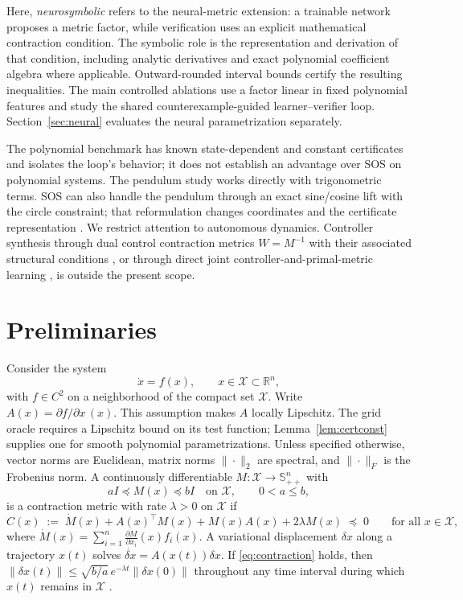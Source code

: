 \documentclass[12pt,onecolumn,journal]{IEEEtran}
\newcommand{\R}{\mathbb{R}}
\newcommand{\Sym}{\mathbb{S}}
\newcommand{\X}{\mathcal{X}}
\begin{document}
Here, \emph{neurosymbolic} refers to the neural-metric extension: a trainable network proposes a metric factor, while verification uses an explicit mathematical contraction condition. The symbolic role is the representation and derivation of that condition, including analytic derivatives and exact polynomial coefficient algebra where applicable. Outward-rounded interval bounds certify the resulting inequalities. The main controlled ablations use a factor linear in fixed polynomial features and study the shared counterexample-guided learner--verifier loop. Section~\ref{sec:neural} evaluates the neural parametrization separately.

The polynomial benchmark has known state-dependent and constant certificates and isolates the loop's behavior; it does not establish an advantage over SOS on polynomial systems. The pendulum study works directly with trigonometric terms. SOS can also handle the pendulum through an exact sine/cosine lift with the circle constraint; that reformulation changes coordinates and the certificate representation \cite{tedrake2026}. We restrict attention to autonomous dynamics. Controller synthesis through dual control contraction metrics $W=M^{-1}$ with their associated structural conditions \cite{manchester2017}, or through direct joint controller-and-primal-metric learning \cite{davydov2025partitioning,harapanahalli2026}, is outside the present scope.

\section{Preliminaries}
\label{sec:prelim}

Consider the system
\begin{equation}
\dot{x} = f(x), \qquad x \in \X \subset \R^n,
\label{eq:sys}
\end{equation}
with $f\in C^2$ on a neighborhood of the compact set $\X$. Write $A(x) = \partial f/\partial x\,(x)$. This assumption makes $A$ locally Lipschitz. The grid oracle requires a Lipschitz bound on its test function; Lemma~\ref{lem:certconst} supplies one for smooth polynomial parametrizations. Unless specified otherwise, vector norms are Euclidean, matrix norms $\|\cdot\|_2$ are spectral, and $\|\cdot\|_F$ is the Frobenius norm. A continuously differentiable $M : \X \to \Sym^n_{++}$ with
\begin{equation}
a I \preceq M(x) \preceq b I \quad \text{on } \X, \qquad 0 < a \le b,
\label{eq:bounds}
\end{equation}
is a contraction metric with rate $\lambda > 0$ on $\X$ if
\begin{equation}
C(x) \;:=\; \dot{M}(x) + A(x)^\top M(x) + M(x) A(x) + 2\lambda M(x) \;\preceq\; 0
\qquad \text{for all } x \in \X,
\label{eq:contraction}
\end{equation}
where $\dot{M}(x) = \sum_{i=1}^{n} \frac{\partial M}{\partial x_i}(x) f_i(x)$. A variational displacement $\delta x$ along a trajectory $x(t)$ solves $\dot{\delta x}=A(x(t))\delta x$. If \eqref{eq:contraction} holds, then $\|\delta x(t)\| \le \sqrt{b/a}\, e^{-\lambda t} \|\delta x(0)\|$ throughout any time interval during which $x(t)$ remains in $\X$ \cite{lohmiller1998}.
\end{document}

